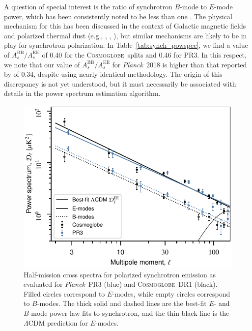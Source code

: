 \documentclass[twocolumn]{../../common/aa}
\def\Planck{\emph{Planck}}
\newcommand{\cosmoglobe}{\textsc{Cosmoglobe}}
\begin{document}
A question of special interest is the ratio of synchrotron $B$-mode to $E$-mode power, which has been consistently noted to be less than one \citep{page2007,planck2014-a12,planck2016-l04,krachmalnicoff2018,QUIJOTE_IV,eimer2023}. The physical mechanism for this has been discussed in the context of Galactic magnetic fields and polarized thermal dust (e.g., \citealp{kandel2017}, \citealp{so_galsci}, \citealp{vacher2023}), but similar mechanisms are likely to be in play for synchrotron polarization. In Table~\ref{tab:synch_powspec}, we find a value of $A_s^\mathrm{BB}/A_s^\mathrm{EE}$ of 0.40 for the \cosmoglobe\ splits and 0.46 for PR3. In this respect, we note that our value of $A_s^\mathrm{BB}/A_s^\mathrm{EE}$ for \Planck\ 2018 is higher than that reported by \citet{planck2016-l04} of 0.34, despite using nearly identical methodology. The origin of this discrepancy is not yet understood, but it must necessarily be associated with details in  the power spectrum estimation algorithm. %

\begin{figure}
        \centering
	\includegraphics[width=\linewidth]{figures/cls_synch_ratio.pdf}
        \caption{
		Half-mission cross spectra for polarized synchrotron emission as evaluated for \Planck\ PR3 (blue) and \cosmoglobe\ DR1 (black). Filled circles correspond to $E$-modes, while empty circles correspond to $B$-modes. The thick solid and dashed lines are the best-fit $E$- and $B$-mode power law fits to synchrotron, and the thin black line is the $\Lambda$CDM prediction for $E$-modes.
        }
        \label{fig:spectra}
\end{figure}
\end{document}
